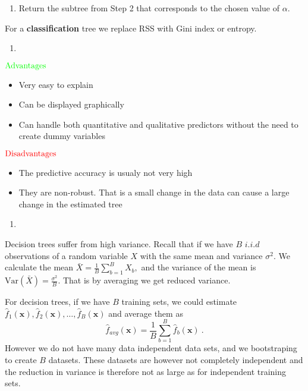 \documentclass[
]{article}
\providecommand{\tightlist}{%
  \setlength{\itemsep}{0pt}\setlength{\parskip}{0pt}}
\begin{document}
\begin{enumerate}
\def\labelenumi{\arabic{enumi}.}
\setcounter{enumi}{3}
\tightlist
\item
  Return the subtree from Step 2 that corresponds to the chosen value of
  \(\alpha.\)
\end{enumerate}

For a \textbf{classification} tree we replace RSS with Gini index or
entropy.

\begin{enumerate}
\def\labelenumi{\alph{enumi})}
\setcounter{enumi}{1}
\tightlist
\item
\end{enumerate}

\(\color{green}{\text{Advantages}}\)

\begin{itemize}
\item
  Very easy to explain
\item
  Can be displayed graphically
\item
  Can handle both quantitative and qualitative predictors without the
  need to create dummy variables
\end{itemize}

\(\color{red}{\text{Disadvantages}}\)

\begin{itemize}
\item
  The predictive accuracy is usualy not very high
\item
  They are non-robust. That is a small change in the data can cause a
  large change in the estimated tree
\end{itemize}

\begin{enumerate}
\def\labelenumi{\alph{enumi})}
\setcounter{enumi}{2}
\tightlist
\item
\end{enumerate}

Decision trees suffer from high variance. Recall that if we have \(B\)
\(i.i.d\) observations of a random variable \(X\) with the same mean and
variance \(\sigma^2.\) We calculate the mean
\(\bar{X} = \frac{1}{B} \sum_{b=1}^B X_b,\) and the variance of the mean
is \(\text{Var}(\bar{X}) = \frac{\sigma^2}{B}.\) That is by averaging we
get reduced variance.

For decision trees, if we have \(B\) training sets, we could estimate
\(\hat{f}_1({\boldsymbol x}),\hat{f}_2({\boldsymbol x}),\ldots, \hat{f}_B({\boldsymbol x})\)
and average them as
\[\hat{f}_{avg}({\boldsymbol x})=\frac{1}{B}\sum_{b=1}^B \hat{f}_b({\boldsymbol x}) \ .\]
However we do not have many data independent data sets, and we
bootstraping to create \(B\) datasets. These datasets are however not
completely independent and the reduction in variance is therefore not as
large as for independent training sets.
\end{document}
